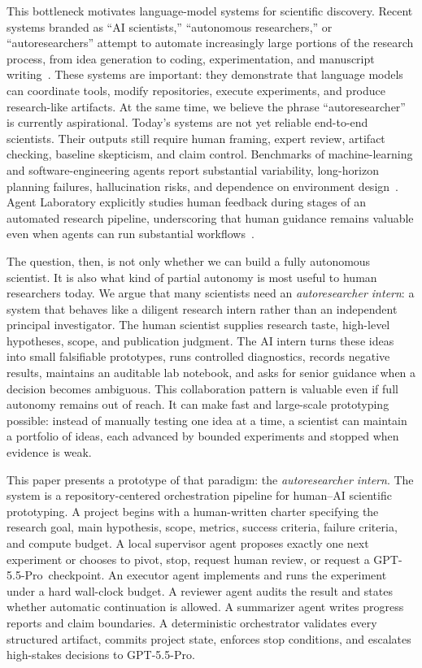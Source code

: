 \documentclass{article}
\newcommand{\intern}{\emph{autoresearcher intern}}
\newcommand{\gptpro}{GPT-5.5-Pro}
\begin{document}
This bottleneck motivates language-model systems for scientific discovery. Recent systems branded as ``AI scientists,'' ``autonomous researchers,'' or ``autoresearchers'' attempt to automate increasingly large portions of the research process, from idea generation to coding, experimentation, and manuscript writing~\citep{lu2024aiscientist,yamada2025aiscientistv2,schmidgall2025agentlab,ghareeb2025robin,ghafarollahi2024sciagents}. These systems are important: they demonstrate that language models can coordinate tools, modify repositories, execute experiments, and produce research-like artifacts. At the same time, we believe the phrase ``autoresearcher'' is currently aspirational. Today's systems are not yet reliable end-to-end scientists. Their outputs still require human framing, expert review, artifact checking, baseline skepticism, and claim control. Benchmarks of machine-learning and software-engineering agents report substantial variability, long-horizon planning failures, hallucination risks, and dependence on environment design~\citep{huang2023mlagentbench,jimenez2023swebench,yang2024sweagent}. Agent Laboratory explicitly studies human feedback during stages of an automated research pipeline, underscoring that human guidance remains valuable even when agents can run substantial workflows~\citep{schmidgall2025agentlab}.

The question, then, is not only whether we can build a fully autonomous scientist. It is also what kind of partial autonomy is most useful to human researchers today. We argue that many scientists need an \intern: a system that behaves like a diligent research intern rather than an independent principal investigator. The human scientist supplies research taste, high-level hypotheses, scope, and publication judgment. The AI intern turns these ideas into small falsifiable prototypes, runs controlled diagnostics, records negative results, maintains an auditable lab notebook, and asks for senior guidance when a decision becomes ambiguous. This collaboration pattern is valuable even if full autonomy remains out of reach. It can make fast and large-scale prototyping possible: instead of manually testing one idea at a time, a scientist can maintain a portfolio of ideas, each advanced by bounded experiments and stopped when evidence is weak.

This paper presents a prototype of that paradigm: the \intern. The system is a repository-centered orchestration pipeline for human--AI scientific prototyping. A project begins with a human-written charter specifying the research goal, main hypothesis, scope, metrics, success criteria, failure criteria, and compute budget. A local supervisor agent proposes exactly one next experiment or chooses to pivot, stop, request human review, or request a \gptpro\ checkpoint. An executor agent implements and runs the experiment under a hard wall-clock budget. A reviewer agent audits the result and states whether automatic continuation is allowed. A summarizer agent writes progress reports and claim boundaries. A deterministic orchestrator validates every structured artifact, commits project state, enforces stop conditions, and escalates high-stakes decisions to \gptpro.
\end{document}
